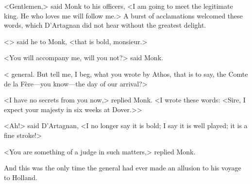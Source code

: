 <Gentlemen,> said Monk to his officers, <I am going to meet the legitimate king. He who loves me will follow me.> A burst of acclamations welcomed these words, which D'Artagnan did not hear without the greatest delight.

<> said he to Monk, <that is bold, monsieur.>

<You will accompany me, will you not?> said Monk.

< general. But tell me, I beg, what you wrote by Athos, that is to say, the Comte de la Fère—you know—the day of our arrival?>

<I have no secrets from you now,> replied Monk. <I wrote these words: <Sire, I expect your majesty in six weeks at Dover.>>

<Ah!> said D'Artagnan, <I no longer say it is bold; I say it is well played; it is a fine stroke!>

<You are something of a judge in such matters,> replied Monk.

And this was the only time the general had ever made an allusion to his voyage to Holland. 